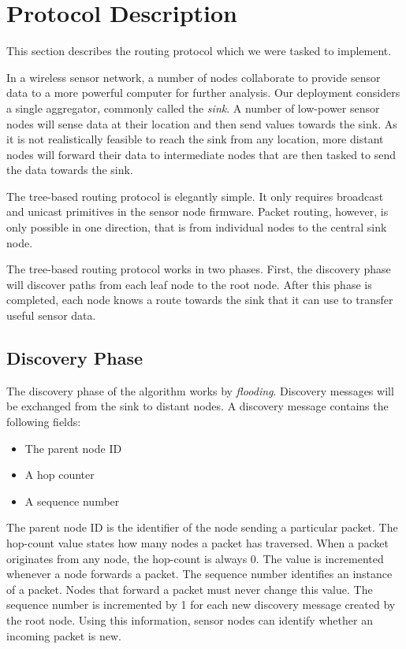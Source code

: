 \documentclass[a4paper]{llncs}
\begin{document}
\section{Protocol Description}

This section describes the routing protocol which we were tasked to implement.

In a wireless sensor network, a number of nodes collaborate to provide sensor data to a more powerful computer for further analysis.
Our deployment considers a single aggregator, commonly called the \textit{sink}.
A number of low-power sensor nodes will sense data at their location and then send values towards the sink.
As it is not realistically feasible to reach the sink from any location, more distant nodes will forward their data to intermediate nodes that are then tasked to send the data towards the sink.

The tree-based routing protocol is elegantly simple.
It only requires broadcast and unicast primitives in the sensor node firmware.
Packet routing, however, is only possible in one direction, that is from individual nodes to the central sink node.

The tree-based routing protocol works in two phases.
First, the discovery phase will discover paths from each leaf node to the root node.
After this phase is completed, each node knows a route towards the sink that it can use to transfer useful sensor data.



\subsection{Discovery Phase}

The discovery phase of the algorithm works by \textit{flooding}.
Discovery messages will be exchanged from the sink to distant nodes.
A discovery message contains the following fields:

\begin{itemize}
\item The parent node ID
\item A hop counter
\item A sequence number
\end{itemize}

The parent node ID is the identifier of the node sending a particular packet.
The hop-count value states how many nodes a packet has traversed.
When a packet originates from any node, the hop-count is always 0.
The value is incremented whenever a node forwards a packet.
The sequence number identifies an instance of a packet.
Nodes that forward a packet must never change this value.
The sequence number is incremented by 1 for each new discovery message created by the root node.
Using this information, sensor nodes can identify whether an incoming packet is new.
\end{document}
